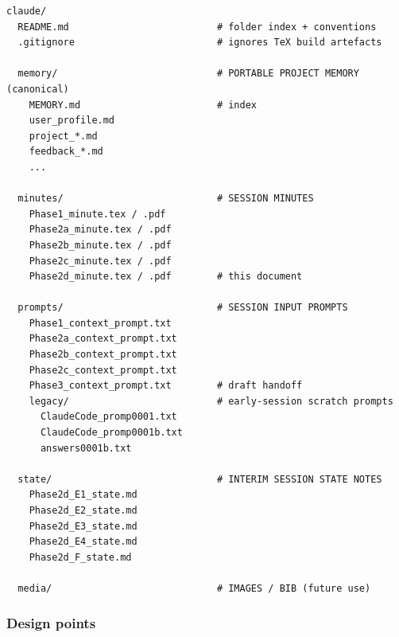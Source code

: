 \documentclass[11pt,a4paper]{article}
\begin{document}
\begin{lstlisting}[basicstyle=\ttfamily\footnotesize]
claude/
  README.md                          # folder index + conventions
  .gitignore                         # ignores TeX build artefacts

  memory/                            # PORTABLE PROJECT MEMORY (canonical)
    MEMORY.md                        # index
    user_profile.md
    project_*.md
    feedback_*.md
    ...

  minutes/                           # SESSION MINUTES
    Phase1_minute.tex / .pdf
    Phase2a_minute.tex / .pdf
    Phase2b_minute.tex / .pdf
    Phase2c_minute.tex / .pdf
    Phase2d_minute.tex / .pdf        # this document

  prompts/                           # SESSION INPUT PROMPTS
    Phase1_context_prompt.txt
    Phase2a_context_prompt.txt
    Phase2b_context_prompt.txt
    Phase2c_context_prompt.txt
    Phase3_context_prompt.txt        # draft handoff
    legacy/                          # early-session scratch prompts
      ClaudeCode_promp0001.txt
      ClaudeCode_promp0001b.txt
      answers0001b.txt

  state/                             # INTERIM SESSION STATE NOTES
    Phase2d_E1_state.md
    Phase2d_E2_state.md
    Phase2d_E3_state.md
    Phase2d_E4_state.md
    Phase2d_F_state.md

  media/                             # IMAGES / BIB (future use)
\end{lstlisting}

\subsubsection{Design points}
\end{document}
